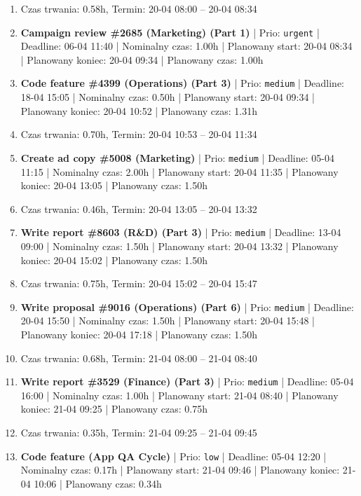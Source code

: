 {\begin{enumerate}
  \item [\textbf{PRZERWA}] Czas trwania: 0.58h, Termin: 20-04 08:00 -- 20-04 08:34
  \item [\textbf{14607}] \textbf{Campaign review \#2685 (Marketing) (Part 1)} | Prio: \texttt{urgent} | Deadline: 06-04 11:40 | Nominalny czas: 1.00h | Planowany start: 20-04 08:34 | Planowany koniec: 20-04 09:34 | Planowany czas: 1.00h
  \item [\textbf{14664}] \textbf{Code feature \#4399 (Operations) (Part 3)} | Prio: \texttt{medium} | Deadline: 18-04 15:05 | Nominalny czas: 0.50h | Planowany start: 20-04 09:34 | Planowany koniec: 20-04 10:52 | Planowany czas: 1.31h
  \item [\textbf{PRZERWA}] Czas trwania: 0.70h, Termin: 20-04 10:53 -- 20-04 11:34
  \item [\textbf{14666}] \textbf{Create ad copy \#5008 (Marketing)} | Prio: \texttt{medium} | Deadline: 05-04 11:15 | Nominalny czas: 2.00h | Planowany start: 20-04 11:35 | Planowany koniec: 20-04 13:05 | Planowany czas: 1.50h
  \item [\textbf{PRZERWA}] Czas trwania: 0.46h, Termin: 20-04 13:05 -- 20-04 13:32
  \item [\textbf{14634}] \textbf{Write report \#8603 (R\&D) (Part 3)} | Prio: \texttt{medium} | Deadline: 13-04 09:00 | Nominalny czas: 1.50h | Planowany start: 20-04 13:32 | Planowany koniec: 20-04 15:02 | Planowany czas: 1.50h
  \item [\textbf{PRZERWA}] Czas trwania: 0.75h, Termin: 20-04 15:02 -- 20-04 15:47
  \item [\textbf{14662}] \textbf{Write proposal \#9016 (Operations) (Part 6)} | Prio: \texttt{medium} | Deadline: 20-04 15:50 | Nominalny czas: 1.50h | Planowany start: 20-04 15:48 | Planowany koniec: 20-04 17:18 | Planowany czas: 1.50h
  \item [\textbf{PRZERWA}] Czas trwania: 0.68h, Termin: 21-04 08:00 -- 21-04 08:40
  \item [\textbf{14672}] \textbf{Write report \#3529 (Finance) (Part 3)} | Prio: \texttt{medium} | Deadline: 05-04 16:00 | Nominalny czas: 1.00h | Planowany start: 21-04 08:40 | Planowany koniec: 21-04 09:25 | Planowany czas: 0.75h
  \item [\textbf{PRZERWA}] Czas trwania: 0.35h, Termin: 21-04 09:25 -- 21-04 09:45
  \item [\textbf{14703}] \textbf{Code feature (App QA Cycle)} | Prio: \texttt{low} | Deadline: 05-04 12:20 | Nominalny czas: 0.17h | Planowany start: 21-04 09:46 | Planowany koniec: 21-04 10:06 | Planowany czas: 0.34h

\end{enumerate}}
